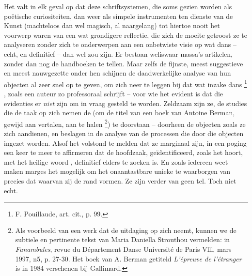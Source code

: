 {Het valt in elk geval op dat deze schriftsystemen, die soms gezien worden als po\"etische curiositeiten, dan weer als simpele instrumenten ten dienste van de Kunst (machteloos dan wel magisch, al naargelang) tot hiertoe nooit het voorwerp waren van een wat grondigere reflectie, die zich de moeite getroost ze te analyseren zonder zich te onderwerpen aan een onbetwiste visie op wat dans {--} echt, en definitief {--} dan wel zou zijn. Er bestaan weliswaar massa's artikelen, zonder dan nog de handboeken te tellen. Maar zelfs de fijnste, meest suggestieve en meest nauwgezette onder hen schijnen de daadwerkelijke analyse van hun objecten al zeer snel op te geven, om zich neer te leggen bij dat wat inzake dans  \footnote{F. Pouillaude, art. cit., p. 99.} , zoals een auteur zo professoraal schrijft {--} voor wie het evident is dat die evidenties er {\em niet} zijn om in vraag gesteld te worden. Zeldzaam zijn ze, de studies die de taak op zich nemen de  (om de titel van een boek van Antoine Berman, gewijd aan vertalen, aan te halen \footnote{Als voorbeeld van een werk dat de uitdaging op zich neemt, kunnen we de subtiele en pertinente tekst van Maria Daniella Strouthou vermelden:  in {\em Funambules}, revue du D\'epartement Danse Universit\'e de Paris Vlll, mars 1997, n{\textdegree}5, p. 27{}-30. Het boek van A. Berman getiteld {\em L'\'epreuve de l'\'etranger} is in 1984 verschenen bij Gallimard.}) te doorstaan {--} doorheen de objecten zoals ze zich aandienen, en beslagen in de analyse van de processen die door die objecten ingezet worden. Alsof het volstond te melden dat ze marginaal zijn, in een poging een keer te meer te affirmeren dat de hoofdzaak, ge\"identificeerd, zoals het hoort, met het heilige woord , definitief elders te zoeken is. En zoals iedereen weet maken marges het mogelijk om het onaantastbare unieke te waarborgen van precies dat waarvan zij de rand vormen. Ze zijn verder van geen tel. Toch niet echt.

}
